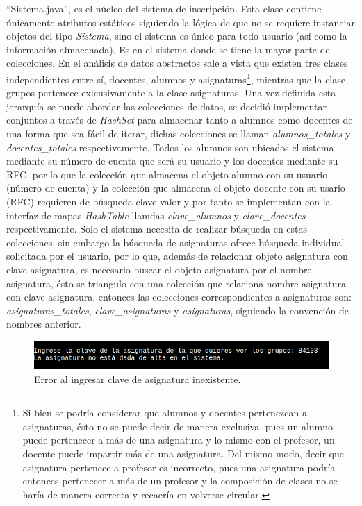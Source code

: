 \documentclass[a4paper,12pt]{article}
\begin{document}
“Sistema.java”, es el núcleo del sistema de inscripción. Esta clase contiene únicamente atributos estáticos siguiendo la lógica de que no se requiere instanciar objetos del tipo \textit{Sistema}, sino el sistema es único para todo usuario (así como la información almacenada). Es en el sistema donde se tiene la mayor parte de colecciones. En el análisis de datos abstractos sale a vista que existen tres clases independientes entre sí, docentes, alumnos y asignaturas\footnote{Si bien se podría considerar que alumnos y docentes pertenezcan a asignaturas, ésto no se puede decir de manera exclusiva, pues un alumno puede pertenecer a más de una asignatura y lo mismo con el profesor, un docente puede impartir más de una asignatura. Del mismo modo, decir que asignatura pertenece a profesor es incorrecto, pues una asignatura podría entonces pertenecer a más de un profesor y la composición de clases no se haría de manera correcta y recaería en volverse circular.}, mientras que la clase grupos pertenece exlcusivamente a la clase asignaturas. Una vez definida esta jerarquía se puede abordar las colecciones de datos, se decidió implementar conjuntos a través de \textit{HashSet} para almacenar tanto a alumnos como docentes de una forma que sea fácil de iterar, dichas colecciones se llaman \textit{alumnos\_totales} y \textit{docentes\_totales} respectivamente. Todos los alumnos son ubicados el sistema mediante su número de cuenta que será su usuario y los docentes mediante su RFC, por lo que la colección que almacena el objeto alumno con su usuario (número de cuenta) y la colección que almacena el objeto docente con su usario (RFC) requieren de búsqueda clave-valor y por tanto se implementan con la interfaz de mapas \textit{HashTable} llamdas \textit{clave\_alumnos} y \textit{clave\_docentes} respectivamente. Solo el sistema necesita de realizar búsqueda en estas colecciones, sin embargo la búsqueda de asignaturas ofrece búsqueda individual solicitada por el usuario, por lo que, además de relacionar objeto asignatura con clave asignatura, es necesario buscar el objeto asignatura por el nombre asignatura, ésto se triangulo con una colección que relaciona nombre asignatura con clave asignatura, entonces las colecciones correspondientes a asignaturas son: \textit{asignaturas\_totales}, \textit{clave\_asignaturas} y \textit{asignaturas}, siguiendo la convención de nombres anterior.\\

\begin{figure}[ht]
    \centering
    \includegraphics[width=.9\textwidth]{media/grupos_por_clave_mal.png}
    \caption{Error al ingresar clave de asignatura inexistente.}
    \label{fig:err1}
\end{figure}
\end{document}
